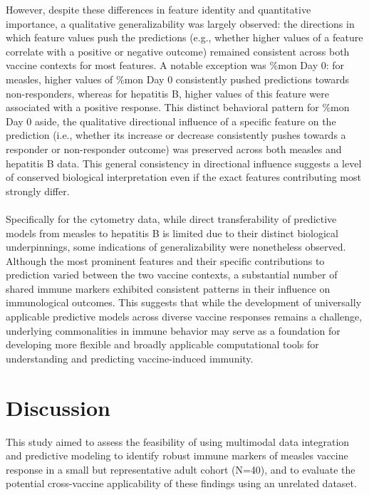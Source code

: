 \documentclass[12pt,a4paper]{report}
\begin{document}
\noindent
However, despite these differences in feature identity and quantitative importance, a qualitative generalizability was largely observed: the directions in which feature values push the predictions (e.g., whether higher values of a feature correlate with a positive or negative outcome) remained consistent across both vaccine contexts for most features. A notable exception was \%\acrshort{mon} Day 0: for measles, higher values of \%\acrshort{mon} Day 0 consistently pushed predictions towards non-responders, whereas for hepatitis B, higher values of this feature were associated with a positive response. This distinct behavioral pattern for \%\acrshort{mon} Day 0 aside, the qualitative directional influence of a specific feature on the prediction (i.e., whether its increase or decrease consistently pushes towards a responder or non-responder outcome) was preserved across both measles and hepatitis B data. This general consistency in directional influence suggests a level of conserved biological interpretation even if the exact features contributing most strongly differ.\\
\\
Specifically for the cytometry data, while direct transferability of predictive models from measles to hepatitis B is limited due to their distinct biological underpinnings, some indications of generalizability were nonetheless observed. Although the most prominent features and their specific contributions to prediction varied between the two vaccine contexts, a substantial number of shared immune markers exhibited consistent patterns in their influence on immunological outcomes. This suggests that while the development of universally applicable predictive models across diverse vaccine responses remains a challenge, underlying commonalities in immune behavior may serve as a foundation for developing more flexible and broadly applicable computational tools for understanding and predicting vaccine-induced immunity.






\chapter{Discussion}
\noindent
This study aimed to assess the feasibility of using multimodal data integration and predictive modeling to identify robust immune markers of measles vaccine response in a small but representative adult cohort (N=40), and to evaluate the potential cross-vaccine applicability of these findings using an unrelated dataset.
\end{document}
